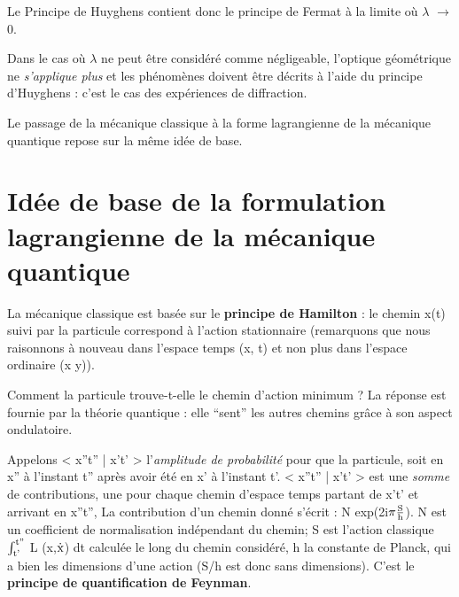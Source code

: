 Le Principe de Huyghens contient donc le principe de Fermat à
la limite où $\lambda$ $\to$ 0.

Dans le cas où $\lambda$ ne peut être considéré comme négligeable,
l'optique géométrique ne {\it s'applique plus} et les phénomènes doivent être
décrits à l'aide du principe d'Huyghens : c'est le cas des expériences
de diffraction.

Le passage de la mécanique classique à la forme lagrangienne
de la mécanique quantique repose sur la même idée de base.
\section{Idée de base de la formulation lagrangienne de la mécanique quantique}
La mécanique classique est basée sur le {\bf principe de Hamilton} :
le chemin x(t) suivi par la particule correspond à l'action stationnaire
(remarquons que nous raisonnons à nouveau dans l'espace temps (x, t) et
non plus dans l'espace ordinaire (x y)).

\begin{center}  \end{center}
Comment la particule trouve-t-elle le chemin d'action minimum ?
La réponse est fournie par la théorie quantique : elle “sent” les autres
chemins grâce à son aspect ondulatoire.

Appelons < x''t'' | x't' > l'{\it amplitude de probabilité} pour que la
particule, soit en x'' à l'instant t'' après avoir été en x' à l'instant t'.
< x''t'' | x't' > est une {\it somme} de contributions, une pour chaque chemin
d'espace temps partant de x't' et arrivant en x''t'', La contribution d'un
chemin donné s'écrit : N exp(2i$\pi \frac{\text{S}}{\text{h}}$). N est un coefficient de normalisation
indépendant du chemin; S est l'action classique $\int_{\text{t'}}^{\text{t''}}$ L (x,$\dot{\text{x}}$) dt calculée
le long du chemin considéré, h la constante de Planck, qui a bien les
dimensions d'une action (S/h est donc sans dimensions). C'est le {\bf principe
de quantification de Feynman}.

